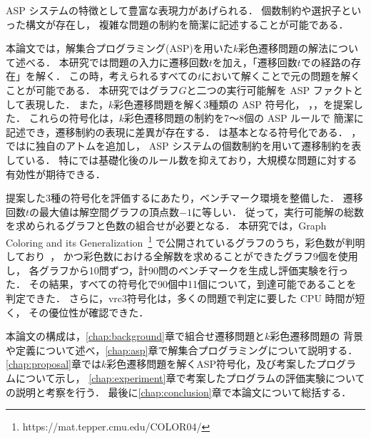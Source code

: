 ASP システムの特徴として豊富な表現力があげられる．
個数制約や選択子といった構文が存在し，
複雑な問題の制約を簡潔に記述することが可能である．

本論文では，解集合プログラミング(ASP)を用いた$k$彩色遷移問題の解法について述べる．
本研究では問題の入力に遷移回数$t$を加え，「遷移回数$t$での経路の存在」を解く．
この時，考えられるすべての$t$において解くことで元の問題を解くことが可能である．
本研究ではグラフ$G$と二つの実行可能解を ASP ファクトとして表現した．
また，$k$彩色遷移問題を解く3種類の ASP 符号化，
，，を提案した．
これらの符号化は，$k$彩色遷移問題の制約を7〜8個の ASP ルールで
簡潔に記述でき，遷移制約の表現に差異が存在する．
は基本となる符号化である．
，ではに独自のアトムを追加し，
ASP システムの個数制約を用いて遷移制約を表している．
特にでは基礎化後のルール数を抑えており，大規模な問題に対する有効性が期待できる．

提案した3種の符号化を評価するにあたり，ベンチマーク環境を整備した．
遷移回数$t$の最大値は解空間グラフの頂点数$-1$に等しい．
従って，実行可能解の総数を求められるグラフと色数の組合せが必要となる．
本研究では，Graph Coloring and its Generalization~\footnote{https://mat.tepper.cmu.edu/COLOR04/}
で公開されているグラフのうち，彩色数が判明しており~\cite{DBLP:journals/constraints/TamuraTKB09}，
かつ彩色数における全解数を求めることができたグラフ9個を使用し，
各グラフから10問ずつ，計90問のベンチマークを生成し評価実験を行った．
その結果，すべての符号化で90個中11個について，到達可能であることを判定できた．
さらに，\textsf{vrc3}符号化は，多くの問題で判定に要した CPU 時間が短く，
その優位性が確認できた．

本論文の構成は，\ref{chap:background}章で組合せ遷移問題と$k$彩色遷移問題の
背景や定義について述べ，\ref{chap:asp}章で解集合プログラミングについて説明する．
\ref{chap:proposal}章では$k$彩色遷移問題を解くASP符号化，及び考案したプログラムについて示し，
\ref{chap:experiment}章で考案したプログラムの評価実験についての説明と考察を行う．
最後に\ref{chap:conclusion}章で本論文について総括する．

